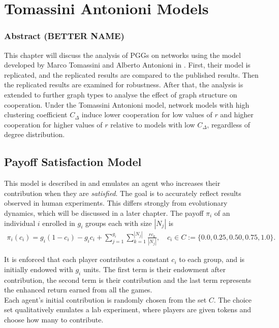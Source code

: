 \section{Tomassini Antonioni Models}

\subsubsection{Abstract (BETTER NAME)}
This chapter will discuss the analysis of PGGs on networks using the model developed by Marco Tomassini and Alberto Antonioni in \cite{RN49}. First, their model is replicated, and the replicated results are compared to the published results. Then the replicated results are examined for robustness. After that, the analysis is extended to further graph types to analyse the effect of graph structure on cooperation. Under the Tomassini Antonioni model, network models with high clustering coefficient $C_\Delta$ induce lower cooperation for low values of $r$ and higher cooperation for higher values of $r$ relative to models with low $C_\Delta$, regardless of degree distribution. \\

\subsection{Payoff Satisfaction Model}
This model is described in \cite{RN49} and emulates an agent who increases their contribution when they are \emph{satisfied}. The goal is to accurately reflect results observed in human experiments. This differs strongly from evolutionary dynamics, which will be discussed in a later chapter. The payoff $\pi_i$ of an individual $i$ enrolled in $g_i$ groups each with size $|N_j|$ is \\
\begin{align} 
    \pi_i(c_i) = g_i(1-c_i) - g_ic_i + \sum_{j=1}^{g_i} \sum_{k=1}^{|N_j|} \frac{rc_k}{|N_j|}, \quad c_i \in C:= \{0.0, 0.25, 0.50, 0.75, 1.0\}. 
\end{align}

It is enforced that each player contributes a constant $c_i$ to each group, and is initially endowed with $g_i$ units. The first term is their endowment after contribution, the second term is their contribution and the last term represents the enhanced return earned from all the games. \\

Each agent's initial contribution is randomly chosen from the set $C$. The choice set qualitatively emulates a lab experiment, where players are given tokens and choose how many to contribute. \\

